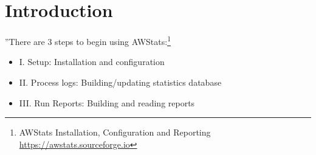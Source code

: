
\newpage
\section{Introduction}
''There are 3 steps to begin using AWStats:\footnote{AWStats Installation, Configuration and Reporting\\
\href{https://awstats.sourceforge.io/docs/awstats_setup.html}{https://awstats.sourceforge.io}
}
\begin{itemize}
  \item I. Setup: Installation and configuration
  \item II. Process logs: Building/updating statistics database
  \item III. Run Reports: Building and reading reports
\end{itemize}
